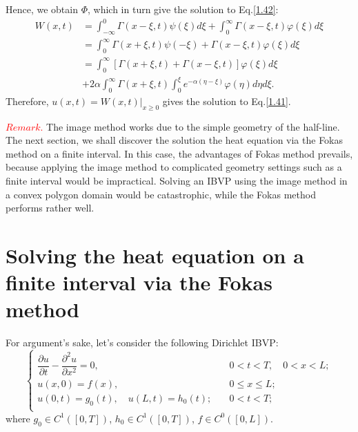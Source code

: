 \documentclass[12pt]{article}
\numberwithin{equation}{section}
\begin{document}
Hence, we obtain $\Phi$, which in turn give the solution to Eq.\eqref{1.42}:
\begin{equation}
    \begin{split}
    W(x,t)&=\int_{-\infty}^{0}\Gamma(x-\xi,t)\psi(\xi)d\xi+\int_{0}^{\infty}\Gamma(x-\xi,t)\varphi(\xi)d\xi\\
    &=\int_{0}^{\infty}\Gamma(x+\xi,t)\psi(-\xi)+\Gamma(x-\xi,t)\varphi(\xi)d\xi\\
    &=\int_{0}^{\infty}[\Gamma(x+\xi,t)+\Gamma(x-\xi,t)]\varphi(\xi)d\xi\\
    &+2\alpha\int_{0}^{\infty}\Gamma(x+\xi,t)\int_{0}^{\xi}e^{-\alpha(\eta-\xi)}\varphi(\eta)d\eta d\xi.
    \end{split}
\end{equation}
Therefore, $u(x,t)=W(x,t)\vert_{x\geqslant 0}$ gives the solution to Eq.\eqref{1.41}.\vspace{5mm}

\textbf{\textcolor{red}{$Remark.$}} The image method works due to the simple geometry of the half-line. The next section, we shall discover the solution the heat equation via the Fokas method on a finite interval. In this case, the advantages of Fokas method prevails, because applying the image method to complicated geometry settings such as a finite interval would be impractical. Solving an IBVP using the image method in a convex polygon domain would be catastrophic, while the Fokas method performs rather well.

\section{Solving the heat equation on a finite interval via the Fokas method}
For argument's sake, let's consider the following Dirichlet IBVP:
\begin{equation}\label{2.1}
    \begin{cases}
        \dfrac{\partial u}{\partial t}-\dfrac{\partial^2 u}{\partial x^2}=0,\quad &0<t<T,\quad 0<x<L ;\\[1.5mm]
        u(x,0)=f(x),\quad &0\leqslant x\leqslant L;\\[1.5mm]
        u(0,t)=g_0(t),\quad u(L,t)=h_0(t);\quad &0<t<T;\\[1.5mm]
    \end{cases}
\end{equation}
where $g_0\in C^1([0,T])$, $h_0\in C^1([0,T])$, $f\in C^0{([0,L])}$.
\end{document}
